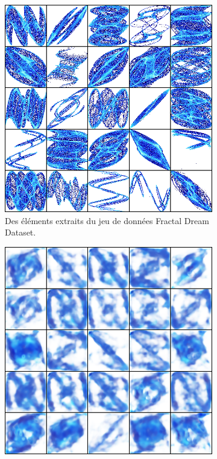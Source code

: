 \documentclass[11pt,francais]{article}
\begin{document}
\begin{figure}[!h]
    \centering
    \begin{subfigure}[b]{0.32\textwidth}
        \includegraphics[width=\textwidth]{Figures/ComparaisonLS/dataset_sample.png}
        \caption{Des éléments extraits du jeu de données Fractal Dream Dataset.}
    \end{subfigure}
    \begin{subfigure}[b]{0.32\textwidth}
        \includegraphics[width=\textwidth]{Figures/ComparaisonLS/scan7_eps0,1_lrelu0,01_0.png}

\end{subfigure}
\end{figure}
\end{document}
